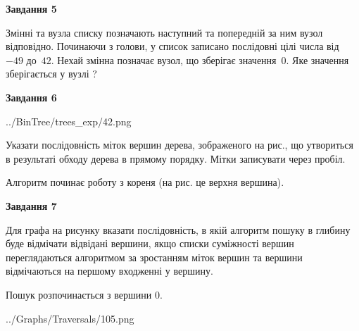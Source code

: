 \documentclass[12pt, ukrainian]{article}
\begin{document}
{\begin {large}
{\begin {center}\textbf{Завдання 5}\end {center}}\par
Змінні  та  вузла списку позначають наступний та попередній за ним вузол відповідно. Починаючи з голови, у список записано послідовні цілі числа від~$-49$ до~$42$. Нехай змінна  позначає вузол, що зберігає значення~$0$.
Яке значення зберігається у вузлі  ?\par
\newpage

{\begin {center}\textbf{Завдання 6}\end {center}}\par

\begin{center}
	{../BinTree/trees_exp/42.png}
\end{center}
Указати послідовність міток вершин дерева, зображеного на рис., що утвориться в результаті обходу дерева в прямому порядку. Мітки записувати через пробіл.\par Алгоритм починає роботу з кореня (на рис. це верхня вершина).\par
\newpage

{\begin {center}\textbf{Завдання 7}\end {center}}\par
Для графа на рисунку вказати послідовність, в якій алгоритм пошуку в глибину буде відмічати відвідані вершини, якщо списки суміжності вершин переглядаються алгоритмом за зростанням міток вершин та вершини відмічаються на першому вход\-женні у вершину.\par
Пошук розпочинається з вершини 0.\par

\begin{center}
	{../Graphs/Traversals/105.png}
\end{center}\par
\newpage


\end{large}}
\end{document}
